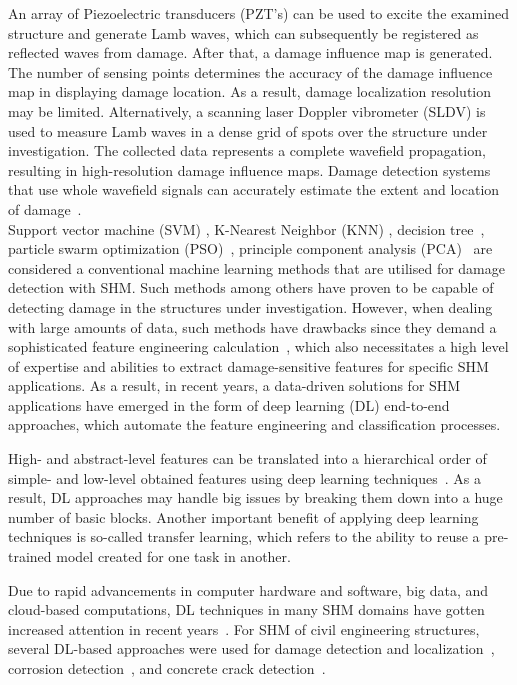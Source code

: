 An array of Piezoelectric transducers (PZT's) can be used to excite the examined structure and generate Lamb waves, which can subsequently be registered as reflected waves from damage.
After that, a damage influence map is generated.
The number of sensing points determines the accuracy of the damage influence map in displaying damage location.
As a result, damage localization resolution may be limited.
Alternatively, a scanning laser Doppler vibrometer  (SLDV) is used to measure Lamb waves in a dense grid of spots over the structure under investigation.
The collected data represents a complete wavefield propagation, resulting in high-resolution damage influence maps.
Damage detection systems that use whole wavefield signals can accurately estimate the extent and location of damage~\cite{Girolamo2018a, kudela2018impact}.
\\
Support vector machine (SVM) \cite{noori2010application, Khoa2014, Ghiasi2016}, K-Nearest Neighbor (KNN) \cite{Vitola2017}, decision tree~\cite{Mariniello2020}, particle swarm optimization (PSO)~\cite{Khatir2018, NouriShirazi2014}, principle component analysis (PCA)~\cite{wang2014principal, nguyen2010fault, liu2014research} are considered a conventional machine learning methods that are utilised for damage detection with SHM.
Such methods among others have proven to be capable of detecting damage in the structures under investigation.
However, when dealing with large amounts of data, such methods have drawbacks since they demand a sophisticated feature engineering calculation~\cite{Gulgec2019}, which also necessitates a high level of expertise and abilities to extract damage-sensitive features for specific SHM applications.
As a result, in recent years, a data-driven solutions for SHM applications have emerged in the form of deep learning (DL) end-to-end approaches, which automate the feature engineering and classification processes.

High- and abstract-level features can be translated into a hierarchical order of simple- and low-level obtained features using deep learning techniques~\cite{goodfellow2016deep}.
As a result, DL approaches may handle big issues by breaking them down into a huge number of basic blocks.
Another important benefit of applying deep learning techniques is so-called transfer learning, which refers to the ability to reuse a pre-trained model created for one task in another.

Due to rapid advancements in computer hardware and software, big data, and cloud-based computations, DL techniques in many SHM domains have gotten increased attention in recent years~\cite{Azimi}.
For SHM of civil engineering structures, several DL-based approaches were used for damage detection and localization~\cite{Cha2018, Kong2018}, corrosion detection~\cite{Atha2018}, and concrete crack detection~\cite{Dung2019}.

